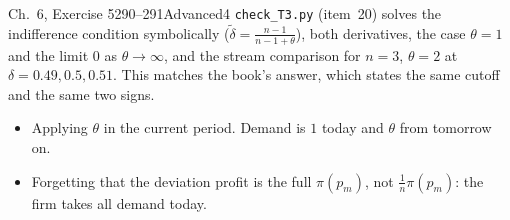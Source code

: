 \begin{exsol}{\MG{} Ch.~6, Exercise 5}{290--291}{Advanced}{4}
\verify \texttt{check\_T3.py} (item~20) solves the indifference condition symbolically
($\tilde\delta = \frac{n-1}{n-1+\theta}$), both derivatives, the case $\theta = 1$ and the limit $0$ as $\theta \to
\infty$, and the stream comparison for $n = 3$, $\theta = 2$ at $\delta = 0.49, 0.5, 0.51$. This matches the book's
answer, which states the same cutoff and the same two signs.

\mistakes
\begin{itemize}
  \item Applying $\theta$ in the current period. Demand is $1$ today and $\theta$ from tomorrow on.
  \item Forgetting that the deviation profit is the full $\pi(p_m)$, not $\frac1n\pi(p_m)$: the firm takes all
  demand today.
\end{itemize}

\end{exsol}
